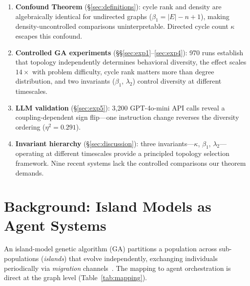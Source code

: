 \documentclass[runningheads]{llncs}
\begin{document}
\begin{enumerate}
  \item \textbf{Confound Theorem} (\S\ref{sec:definitions}): cycle rank
    and density are algebraically identical for undirected graphs
    ($\beta_1 = |E| - n + 1$), making density-uncontrolled comparisons
    uninterpretable. Directed cycle count $\kappa$ escapes this confound.

  \item \textbf{Controlled GA experiments} (\S\S\ref{sec:exp1}--\ref{sec:exp4}):
    970 runs establish that topology independently determines
    behavioral diversity, the effect scales $14\times$ with problem
    difficulty, cycle rank matters more than degree distribution, and
    two invariants ($\beta_1$, $\lambda_2$) control diversity at
    different timescales.

  \item \textbf{LLM validation} (\S\ref{sec:exp5}): 3,200
    GPT-4o-mini API calls reveal a coupling-dependent sign
    flip---one instruction change reverses the diversity ordering
    ($\eta^2 = 0.291$).

  \item \textbf{Invariant hierarchy} (\S\ref{sec:discussion}):
    three invariants---$\kappa$, $\beta_1$, $\lambda_2$---operating at
    different timescales provide a principled topology selection
    framework. Nine recent systems lack the controlled comparisons our
    theorem demands.
\end{enumerate}

\section{Background: Island Models as Agent Systems}
\label{sec:background}

An island-model genetic algorithm (GA) partitions a population across
sub-populations (\emph{islands}) that evolve independently, exchanging
individuals periodically via \emph{migration}
channels~\cite{tomassini2005spatially}. The mapping to agent
orchestration is direct at the graph level (Table~\ref{tab:mapping}).
\end{document}

